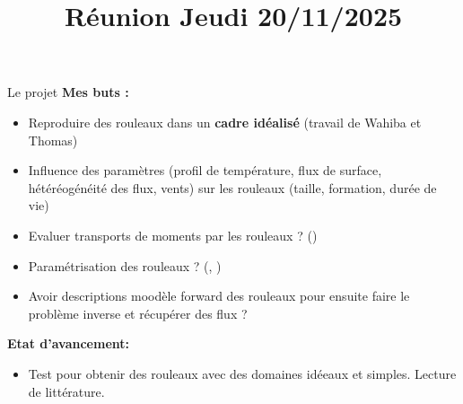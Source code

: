
%
\graphicspath{{../../../FIGURES/}}

\title{Réunion Jeudi 20/11/2025}
\author{}

\usepackage[backend=biber,style=authoryear]{biblatex}



\begin{frame}
\maketitle
\end{frame}

\begin{frame}{Le projet}
\textbf{Mes buts :}

\begin{itemize}
  \item Reproduire des rouleaux dans un \textbf{cadre idéalisé} (travail de Wahiba et Thomas)
  \item Influence des paramètres (profil de température, flux de surface, hétéréogénéité des flux, vents) sur les rouleaux (taille, formation, durée de vie)
  \item Evaluer transports de moments par les rouleaux ? (\cite{gryschkaImpactForcedRoll2014}) 
  \item Paramétrisation des rouleaux ? (\cite{fosterWhyRollsAre2005},  \cite{wangDeepLearningParameterization2023})
  \item Avoir descriptions moodèle forward des rouleaux pour ensuite faire le problème inverse et récupérer des flux ? 
  \end{itemize}
  \textbf{Etat d'avancement:}
  \begin{itemize}
    \item  Test pour obtenir des rouleaux avec des domaines idéeaux et simples. Lecture de littérature. 
  \end{itemize}
\end{frame}


